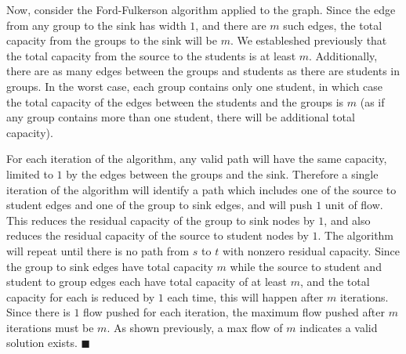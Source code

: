 \documentclass{article}
\begin{document}
Now, consider the Ford-Fulkerson algorithm applied to the graph. Since the edge from any group to the sink has width $1$, and there are $m$ such edges, the total capacity from the groups to the sink will be $m$. We estableshed previously that the total capacity from the source to the students is at least $m$. Additionally, there are as many edges between the groups and students as there are students in groups. In the worst case, each group contains only one student, in which case the total capacity of the edges between the students and the groups is $m$ (as if any group contains more than one student, there will be additional total capacity). 

For each iteration of the algorithm, any valid path will have the same capacity, limited to $1$ by the edges between the groups and the sink. Therefore a single iteration of the algorithm will identify a path which includes one of the source to student edges and one of the group to sink edges, and will push $1$ unit of flow. This reduces the residual capacity of the group to sink nodes by $1$, and also reduces the residual capacity of the source to student nodes by $1$. The algorithm will repeat until there is no path from $s$ to $t$ with nonzero residual capacity. Since the group to sink edges have total capacity $m$ while the source to student and student to group edges each have total capacity of at least $m$, and the total capacity for each is reduced by $1$ each time, this will happen after $m$ iterations. Since there is $1$ flow pushed for each iteration, the maximum flow pushed after $m$ iterations must be $m$. As shown previously, a max flow of $m$ indicates a valid solution exists. $\blacksquare$
\end{document}
